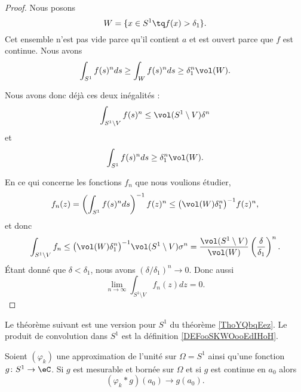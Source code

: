 \begin{proof}
	Nous posons
	\begin{equation}
		W=\{ x\in S^1\tq f(x)>\delta_1 \}.
	\end{equation}
	Cet ensemble n'est pas vide parce qu'il contient \( a\) et est ouvert parce que \( f\) est continue. Nous avons
	\begin{equation}
		\int_{S^1}f(s)^nds\geq \int_{W}f(s)^nds\geq \delta_1^n\vol(W).
	\end{equation}

	Nous avons donc déjà ces deux inégalités :
	\begin{equation}
		\int_{S^1\setminus V}f(s)^n\leq \vol(S^1\setminus V)\delta^n
	\end{equation}
	et
	\begin{equation}
		\int_{S^1}f(s)^nds\geq \delta_1^n\vol(W).
	\end{equation}

	En ce qui concerne les fonctions \( f_n\) que nous voulions étudier,
	\begin{equation}
		f_n(z)=\left( \int_{S^1}f(s)^nds \right)^{-1}f(z)^n\leq \big( \vol(W)\delta_1^n \big)^{-1}f(z)^n,
	\end{equation}
	et donc
	\begin{equation}
		\int_{S^1\setminus V}f_n\leq\big( \vol(W)\delta_1^n \big)^{-1}\vol(S^1\setminus V)\sigma^n=\frac{ \vol(S^1\setminus V) }{ \vol(W) }\left( \frac{ \delta }{ \delta_1 } \right)^n.
	\end{equation}
	Étant donné que \( \delta<\delta_1\), nous avons \( (\delta/\delta_1)^n\to 0\). Donc aussi
	\begin{equation}
		\lim_{n\to \infty} \int_{S^1\setminus V}f_n(z)dz=0.
	\end{equation}
\end{proof}

Le théorème suivant est une version pour \( S^1\) du théorème \ref{ThoYQbqEez}. Le produit de convolution dans \( S^1\) est la définition \ref{DEFooSKWOooEdIHoH}.
\begin{theorem}         \label{THOooIAOPooELSNxq}
	Soient \( (\varphi_k)\) une approximation de l'unité sur \( \Omega=S^1\) ainsi qu'une fonction \( g\colon S^1\to \eC\). Si \( g\) est mesurable et bornée sur \( \Omega\) et si \( g\) est continue en \( a_0\) alors
	\begin{equation}
		(\varphi_k*g)(a_0)\to g(a_0).
	\end{equation}
\end{theorem}

